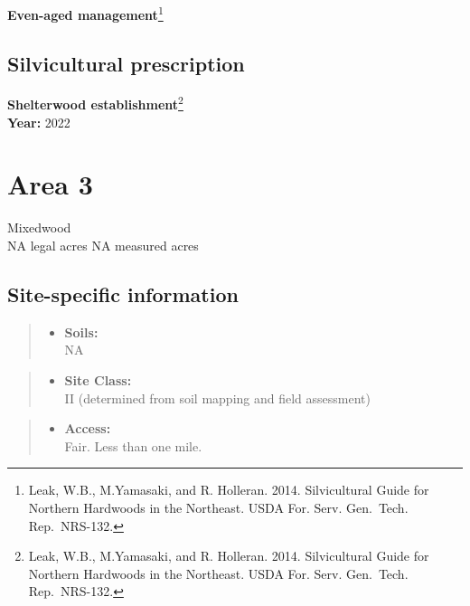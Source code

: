 \documentclass[]{tufte-handout}
\providecommand{\tightlist}{%
  \setlength{\itemsep}{0pt}\setlength{\parskip}{0pt}}
\begin{document}
\textbf{Even-aged management}\footnote{Leak, W.B., M.Yamasaki, and R.
  Holleran. 2014. Silvicultural Guide for Northern Hardwoods in the
  Northeast. USDA For. Serv. Gen.~Tech. Rep.~NRS-132.}

\subsection{Silvicultural
prescription}\label{silvicultural-prescription-1}

\textbf{Shelterwood establishment}\footnote{Leak, W.B., M.Yamasaki, and
  R. Holleran. 2014. Silvicultural Guide for Northern Hardwoods in the
  Northeast. USDA For. Serv. Gen.~Tech. Rep.~NRS-132.}\\
\textbf{Year:} 2022

\newpage

\section{Area 3}\label{area-3}

Mixedwood\\
\noindent NA legal acres \textbar{} NA measured acres

\subsection{Site-specific
information}\label{site-specific-information-2}

\begin{quote}
\begin{itemize}
\tightlist
\item
  \textbf{Soils:}\\
  \indent\indent  NA
\end{itemize}
\end{quote}

\begin{quote}
\begin{itemize}
\tightlist
\item
  \textbf{Site Class:}\\
  \vspace{2pt} II (determined from soil mapping and field assessment)
\end{itemize}
\end{quote}

\begin{quote}
\begin{itemize}
\tightlist
\item
  \textbf{Access:}\\
  \vspace{2pt} Fair. Less than one mile.
\end{itemize}
\end{quote}
\end{document}

